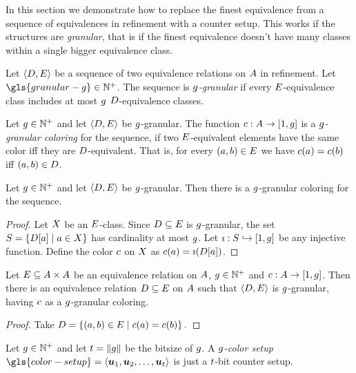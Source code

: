 
In this section we demonstrate how to replace the finest equivalence from a
sequence of equivalences in refinement with a counter setup. This works if the
structures are \emph{granular},
that is if the finest equivalence doesn't have many classes within a single
bigger equivalence class.

\begin{definition}
Let $\left\langle D,E \right\rangle$ be a sequence of two equivalence relations on $A$ in
refinement.
Let $\gls{granular-g} \in \pNats$.
The sequence is \emph{$g$-granular} if every $E$-equivalence class
includes at most $g$ $D$-equivalence classes.
\end{definition}
\begin{definition}
Let $g \in \mathbb{N}^{+}$ and let $\left\langle D,E \right\rangle$ be $g$-granular.
The function $c : A \to [1,g]$ is a \emph{$g$-granular coloring} for
the sequence,
if two $E$-equivalent elements have the same color iff they are
$D$-equivalent.
That is, for every $(a,b) \in E$ we have
$c(a) = c(b)$ iff $(a,b) \in D$.
\end{definition}
\begin{remark}\label{rem:granular-exists}
Let $g \in \mathbb{N}^{+}$ and let $\left\langle D,E \right\rangle$ be $g$-granular.
Then there is a $g$-granular coloring for the sequence.
\end{remark}
\begin{proof}
Let $X$ be an $E$-class.
Since $D \subseteq E$ is $g$-granular,
the set $S = \left\{D[a]\mathrel{}\middle|\mathrel{}a \in X\right\}$ has cardinality at most
$g$.
Let $\imath : S \hookrightarrow [1,g]$ be any injective function.
Define the color $c$ on $X$ as $c(a) = \imath(D[a])$.
\end{proof}

\begin{remark}\label{rem:granular-color}
Let $E \subseteq {A\times A}$ be an equivalence relation on $A$,
$g \in \mathbb{N}^{+}$ and $c : A \to [1,g]$.
Then there is an equivalence relation $D \subseteq E$ on $A$ such
that $\left\langle D,E \right\rangle$ is $g$-granular, having $c$ as a $g$-granular
coloring.
\end{remark}
\begin{proof}
Take $D = \left\{(a,b) \in E\mathrel{}\middle|\mathrel{}c(a) = c(b)\right\}.$
\end{proof}

\begin{definition}
Let $g \in \mathbb{N}^{+}$ and let $t = \|g\|$ be the bitsize of $g$.
A \emph{$g$-color setup}
${\gls{color-setup} = \seq{\suu1,\suu2,\dots,\suu\tbit}}$ is just a $t$-bit
counter setup.
\end{definition}

